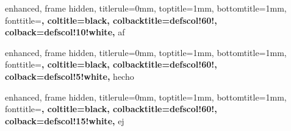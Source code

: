 \newenvironment{propp}{
	{\noindent{\it \textbf{Demostración.}}}
	\tcolorbox[blanker,breakable,left=5mm,parbox=false,
	before upper={\parindent15pt},
	after skip=10pt,
	borderline west={1mm}{0pt}{prpscol!40!white}]
}{
	\textcolor{prpscol!40!white}{\hbox{}\nobreak\hfill$\blacksquare$} 
	\endtcolorbox
}




{
	enhanced,
	frame hidden,
	titlerule=0mm,
	toptitle=1mm,
	bottomtitle=1mm,
	fonttitle=\bfseries\large,
	coltitle=black,
	colbacktitle=defscol!60!,
	colback=defscol!10!white,
}{af}



\newenvironment{afp}{
	{\noindent{\it \textbf{Demostración.}}}
	\tcolorbox[blanker,breakable,left=5mm,parbox=false,
	before upper={\parindent15pt},
	after skip=10pt,
	borderline west={1mm}{0pt}{clmscol!40!white}]
}{
	\textcolor{clmscol!40!white}{\hbox{}\nobreak\hfill$\blacksquare$} 
	\endtcolorbox
}



{
	enhanced,
	frame hidden,
	titlerule=0mm,
	toptitle=1mm,
	bottomtitle=1mm,
	fonttitle=\bfseries\large,
	coltitle=black,
	colbacktitle=defscol!60!,
	colback=defscol!5!white,
}{hecho}





{
	enhanced,
	frame hidden,
	titlerule=0mm,
	toptitle=1mm,
	bottomtitle=1mm,
	fonttitle=\bfseries\large,
	coltitle=black,
	colbacktitle=defscol!60!,
	colback=defscol!15!white,
}{ej}

